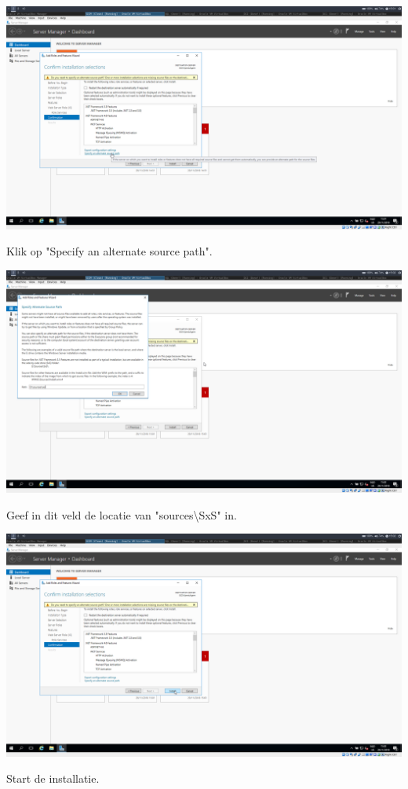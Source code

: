 \documentclass[a4paper]{article}
\begin{document}
\begin{center}
	\includegraphics[width=15cm]{Pictures/SCCM/3/1543500082.png}
	
	Klik op "Specify an alternate source path".
\end{center}
\begin{center}
	\includegraphics[width=15cm]{Pictures/SCCM/3/1543500136.png}
	
	Geef in dit veld de locatie van "sources\textbackslash SxS" in.
\end{center}
\begin{center}
	\includegraphics[width=15cm]{Pictures/SCCM/3/1543500140.png}
	
	Start de installatie.
\end{center}
\end{document}
